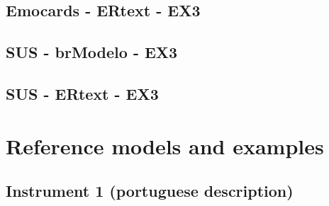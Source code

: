 \begin{apendicesenv}
\newpage

\section{Emocards - ERtext - EX3}


\begin{figure}[!htb]
    \centering
    
    \label{fig:ex3EmocardsERtext}
\end{figure}

\newpage

\section{SUS - brModelo - EX3}

\begin{figure}[!htb]
    \centering
    
    \label{fig:ex3EmocardsERtext}
\end{figure}

\newpage


\section{SUS - ERtext - EX3}

\begin{figure}[!htb]
    \centering
    
    \label{fig:ex3EmocardsERtext}
\end{figure}

\end{apendicesenv}

\chapter{Reference models and examples}\label{ap:referenceModels}


\section{Instrument 1 (portuguese description)} \label{ap:Inst1Exp}

